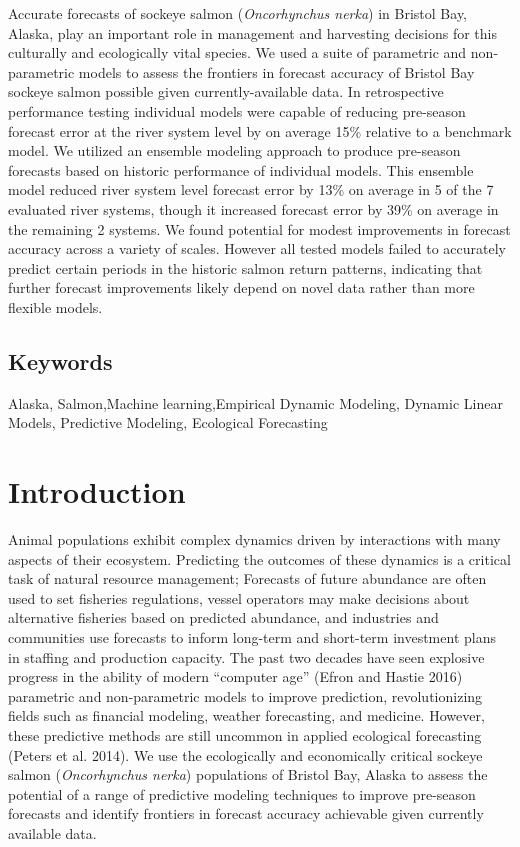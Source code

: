 \documentclass[
]{article}
\begin{document}
Accurate forecasts of sockeye salmon (\emph{Oncorhynchus nerka}) in Bristol Bay, Alaska, play an important role in management and harvesting decisions for this culturally and ecologically vital species. We used a suite of parametric and non-parametric models to assess the frontiers in forecast accuracy of Bristol Bay sockeye salmon possible given currently-available data. In retrospective performance testing individual models were capable of reducing pre-season forecast error at the river system level by on average 15\% relative to a benchmark model. We utilized an ensemble modeling approach to produce pre-season forecasts based on historic performance of individual models. This ensemble model reduced river system level forecast error by 13\% on average in 5 of the 7 evaluated river systems, though it increased forecast error by 39\% on average in the remaining 2 systems. We found potential for modest improvements in forecast accuracy across a variety of scales. However all tested models failed to accurately predict certain periods in the historic salmon return patterns, indicating that further forecast improvements likely depend on novel data rather than more flexible models.

\hypertarget{keywords}{%
\subsection*{Keywords}\label{keywords}}

Alaska, Salmon,Machine learning,Empirical Dynamic Modeling, Dynamic Linear Models, Predictive Modeling, Ecological Forecasting

\newpage

\hypertarget{introduction}{%
\section{Introduction}\label{introduction}}

Animal populations exhibit complex dynamics driven by interactions with many aspects of their ecosystem. Predicting the outcomes of these dynamics is a critical task of natural resource management; Forecasts of future abundance are often used to set fisheries regulations, vessel operators may make decisions about alternative fisheries based on predicted abundance, and industries and communities use forecasts to inform long-term and short-term investment plans in staffing and production capacity. The past two decades have seen explosive progress in the ability of modern ``computer age'' (Efron and Hastie 2016) parametric and non-parametric models to improve prediction, revolutionizing fields such as financial modeling, weather forecasting, and medicine. However, these predictive methods are still uncommon in applied ecological forecasting (Peters et al. 2014). We use the ecologically and economically critical sockeye salmon (\emph{Oncorhynchus nerka}) populations of Bristol Bay, Alaska to assess the potential of a range of predictive modeling techniques to improve pre-season forecasts and identify frontiers in forecast accuracy achievable given currently available data.
\end{document}
